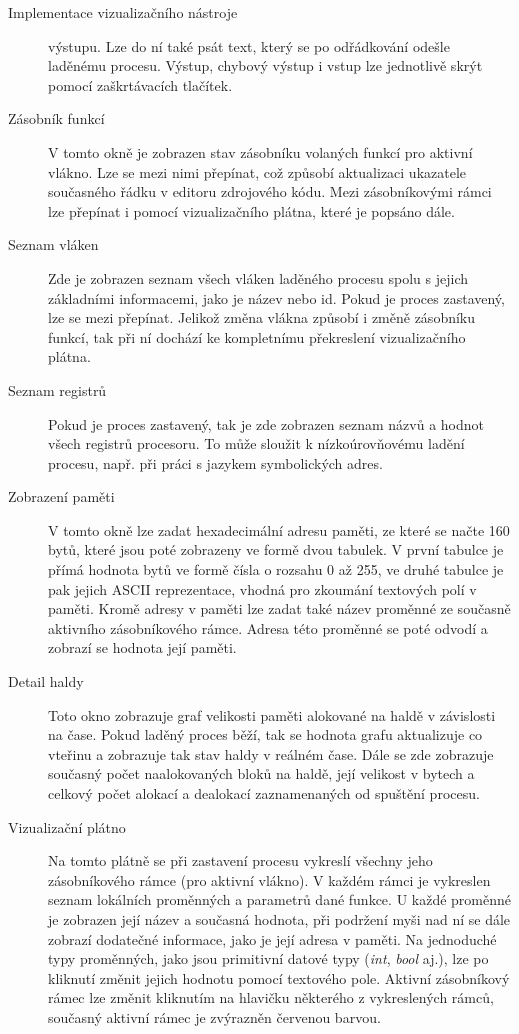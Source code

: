 \documentclass[bc,male,python,dept460]{diploma}						%
\begin{document}
\begin{section}{Implementace vizualizačního nástroje}
\begin{description}
			výstupu. Lze do ní také psát text, který se po odřádkování odešle laděnému procesu. Výstup, chybový výstup i vstup lze jednotlivě skrýt pomocí
			zaškrtávacích tlačítek.
		\item[Zásobník funkcí] V tomto okně je zobrazen stav zásobníku volaných funkcí pro aktivní vlákno. Lze se mezi nimi přepínat, což způsobí aktualizaci
			ukazatele současného řádku v editoru zdrojového kódu. Mezi zásobníkovými rámci lze přepínat i pomocí vizualizačního plátna, které je popsáno dále.
		\item[Seznam vláken] Zde je zobrazen seznam všech vláken laděného procesu spolu s jejich základními informacemi, jako je název nebo id. Pokud je proces
			zastavený, lze se mezi přepínat. Jelikož změna vlákna způsobí i změně zásobníku funkcí, tak při ní dochází ke kompletnímu překreslení vizualizačního
			plátna.
		\item[Seznam registrů]
			Pokud je proces zastavený, tak je zde zobrazen seznam názvů a hodnot všech registrů procesoru. To může sloužit k nízkoúrovňovému ladění procesu, např.
			při práci s jazykem symbolických adres.
		\item[Zobrazení paměti] V tomto okně lze zadat hexadecimální adresu paměti, ze které se načte 160 bytů, které jsou poté zobrazeny ve formě dvou tabulek.
			V první tabulce je přímá hodnota bytů ve formě čísla o rozsahu 0 až 255, ve druhé tabulce je pak jejich ASCII reprezentace, vhodná pro zkoumání textových
			polí v paměti. Kromě adresy v paměti lze zadat také název proměnné ze současně aktivního zásobníkového rámce. Adresa této proměnné se poté odvodí
			a zobrazí se hodnota její paměti.
		\item[Detail haldy]
			Toto okno zobrazuje graf velikosti paměti alokované na haldě v závislosti na čase. Pokud laděný proces běží, tak se hodnota grafu aktualizuje co vteřinu
			a zobrazuje tak stav haldy v reálném čase. Dále se zde zobrazuje současný počet naalokovaných bloků na haldě, její velikost v bytech a celkový počet
			alokací a dealokací zaznamenaných od spuštění procesu.
		\item[Vizualizační plátno] Na tomto plátně se při zastavení procesu vykreslí všechny jeho zásobníkového rámce (pro aktivní vlákno). V každém rámci je
			vykreslen seznam lokálních proměnných a parametrů dané funkce. U každé proměnné je zobrazen její název a současná hodnota, při podržení myši nad ní se dále
			zobrazí dodatečné informace, jako je její adresa v paměti. Na jednoduché typy proměnných, jako jsou primitivní datové typy (\textit{int}, \textit{bool}
			aj.), lze po kliknutí změnit jejich hodnotu pomocí textového pole. Aktivní zásobníkový rámec lze změnit kliknutím na hlavičku některého z vykreslených
			rámců, současný aktivní rámec je zvýrazněn červenou barvou.		
	\end{description}
	

\end{section}
\end{document}
